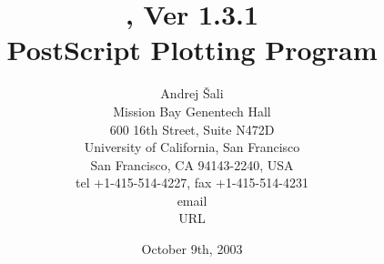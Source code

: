 \title{\vspace{3cm} \ASGL, Ver 1.3.1 \\[1cm]
       PostScript Plotting Program \\[3cm]}

\author{Andrej \v{S}ali \\[0.5cm]
Mission Bay Genentech Hall \\
600 16th Street, Suite N472D \\
University of California, San Francisco \\
San Francisco, CA 94143-2240, USA \\
tel +1-415-514-4227, fax +1-415-514-4231  \\
email  \\
URL 
}

\date{October 9th, 2003}
